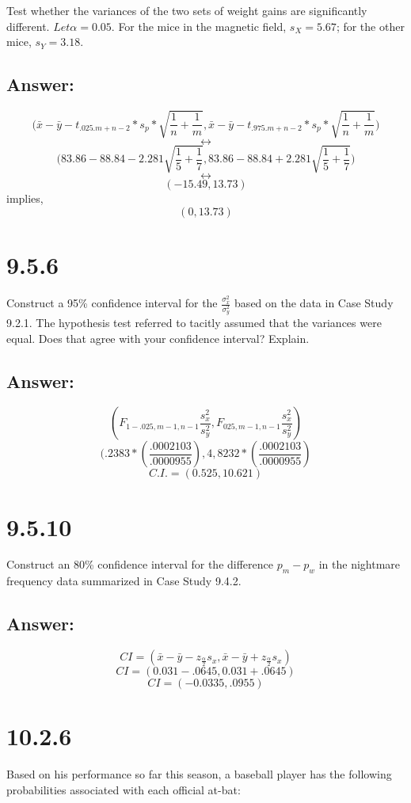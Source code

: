\documentclass[svgnames]{article}
\begin{document}
Test whether the variances of the two sets of weight gains are significantly different. $Let \alpha = 0.05$. For the mice in the magnetic field, $s_X = 5.67$; for the other mice, $s_Y = 3.18$.

\subsection{Answer:}
$$\Big(\bar{x} - \bar{y} - t_{.025.m+n-2}*s_p*\sqrt{\frac{1}{n}+\frac{1}{m}} , \bar{x} - \bar{y} - t_{.975.m+n-2}*s_p*\sqrt{\frac{1}{n}+\frac{1}{m}}\Big)$$
$$\leftrightarrow$$
$$\Big(83.86-88.84  - 2.281\sqrt{\frac{1}{5}+\frac{1}{7}} , 83.86-88.84  + 2.281\sqrt{\frac{1}{5}+\frac{1}{7}}\Big)$$
$$\leftrightarrow$$
$$(-15.49, 13.73)$$
implies,
$$(0, 13.73)$$

\section{9.5.6}
Construct a 95\% confidence interval for the $\frac{\sigma_{x}^2}{\sigma^2_{y}}$ based on the data in Case Study 9.2.1. The hypothesis test referred to tacitly assumed that the variances were equal. Does that agree with your confidence interval? Explain.


\subsection*{Answer:}

$$(F_{1-.025,m-1,n-1}\frac{s_x^2}{s_y^2},F_{025,m-1,n-1}\frac{s_x^2}{s_y^2})$$
$$(.2383*(\frac{.0002103}{.0000955}),4,8232*(\frac{.0002103}{.0000955})$$
$$C.I. =(0.525,10.621)$$


\section{9.5.10}
Construct an 80\% confidence interval for the difference $p_m-p_w$ in the nightmare frequency data summarized in Case Study 9.4.2.

\subsection*{Answer:}
$$CI= (\bar{x}-\bar{y}- z_{\frac{\alpha}{2}}s_x, \bar{x}-\bar{y} + z_{\frac{\alpha}{2}}s_x)$$
$$CI= (0.031-.0645, 0.031+.0645)$$
$$CI= (-0.0335, .0955)$$

\section{10.2.6}
Based on his performance so far this season, a baseball player has the following probabilities associated with each official at-bat:
\end{document}
